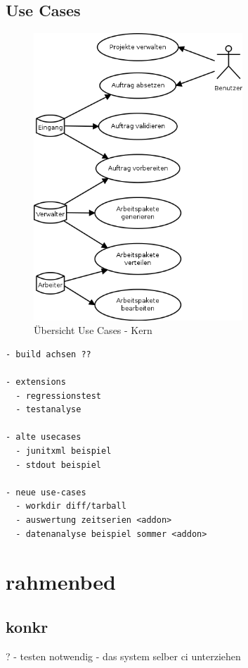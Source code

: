 \subsection{Use Cases}



\begin{figure}[ht]
  \centering
  \label{fig:use-case-muss}
  \includegraphics[width=0.7\textwidth]{imageinput/use-case-muss.png}
  \caption{\"Ubersicht Use Cases - Kern}
\end{figure}


\begin{verbatim}
- build achsen ??

- extensions
  - regressionstest
  - testanalyse

- alte usecases
  - junitxml beispiel
  - stdout beispiel

- neue use-cases
  - workdir diff/tarball
  - auswertung zeitserien <addon>
  - datenanalyse beispiel sommer <addon>
\end{verbatim}


\section{rahmenbed}

\subsection{konkr}?
- testen notwendig
- das system selber ci unterziehen

